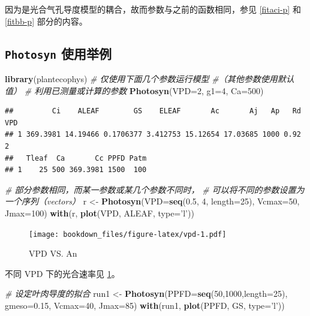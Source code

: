 \documentclass[]{krantz}
\makeatletter
\newenvironment{Shaded}{\begin{snugshade}}{\end{snugshade}}
\newcommand{\KeywordTok}[1]{\textcolor[rgb]{0.13,0.29,0.53}{\textbf{#1}}}
\newcommand{\DataTypeTok}[1]{\textcolor[rgb]{0.13,0.29,0.53}{#1}}
\newcommand{\DecValTok}[1]{\textcolor[rgb]{0.00,0.00,0.81}{#1}}
\newcommand{\FloatTok}[1]{\textcolor[rgb]{0.00,0.00,0.81}{#1}}
\newcommand{\StringTok}[1]{\textcolor[rgb]{0.31,0.60,0.02}{#1}}
\newcommand{\CommentTok}[1]{\textcolor[rgb]{0.56,0.35,0.01}{\textit{#1}}}
\newcommand{\NormalTok}[1]{#1}
\newenvironment{kframe}{%
\medskip{}
\setlength{\fboxsep}{.8em}
 \def\at@end@of@kframe{}%
 \ifinner\ifhmode%
  \def\at@end@of@kframe{\end{minipage}}%
  \begin{minipage}{\columnwidth}%
 \fi\fi%
 \def\FrameCommand##1{\hskip\@totalleftmargin \hskip-\fboxsep
 \colorbox{shadecolor}{##1}\hskip-\fboxsep
     \hskip-\linewidth \hskip-\@totalleftmargin \hskip\columnwidth}%
 \MakeFramed {\advance\hsize-\width
   \@totalleftmargin\z@ \linewidth\hsize
   \@setminipage}}%
 {\par\unskip\endMakeFramed%
 \at@end@of@kframe}
\renewenvironment{Shaded}{\begin{kframe}}{\end{kframe}}
\theoremstyle{definition}
\theoremstyle{definition}
\theoremstyle{definition}
\theoremstyle{remark}
\makeatother
\begin{document}
因为是光合气孔导度模型的耦合，故而参数与之前的函数相同，参见
\ref{fitaci-p} 和 \ref{fitbb-p} 部分的内容。

\subsection{\texorpdfstring{\texttt{Photosyn}
使用举例}{Photosyn 使用举例}}\label{photosyn-}

\begin{Shaded}
\begin{Highlighting}[]
\KeywordTok{library}\NormalTok{(plantecophys)}
\CommentTok{# 仅使用下面几个参数运行模型}
\CommentTok{#（其他参数使用默认值）}
\CommentTok{# 利用已测量或计算的参数}
\KeywordTok{Photosyn}\NormalTok{(}\DataTypeTok{VPD=}\DecValTok{2}\NormalTok{, }\DataTypeTok{g1=}\DecValTok{4}\NormalTok{, }\DataTypeTok{Ca=}\DecValTok{500}\NormalTok{)}
\end{Highlighting}
\end{Shaded}

\begin{verbatim}
##         Ci    ALEAF        GS    ELEAF       Ac       Aj   Ap   Rd VPD
## 1 369.3981 14.19466 0.1706377 3.412753 15.12654 17.03685 1000 0.92   2
##   Tleaf  Ca       Cc PPFD Patm
## 1    25 500 369.3981 1500  100
\end{verbatim}

\begin{Shaded}
\begin{Highlighting}[]
\CommentTok{# 部分参数相同，而某一参数或某几个参数不同时，}
\CommentTok{# 可以将不同的参数设置为一个序列（vectors）}
\NormalTok{r <-}\StringTok{ }\KeywordTok{Photosyn}\NormalTok{(}\DataTypeTok{VPD=}\KeywordTok{seq}\NormalTok{(}\FloatTok{0.5}\NormalTok{, }\DecValTok{4}\NormalTok{, }\DataTypeTok{length=}\DecValTok{25}\NormalTok{), }
              \DataTypeTok{Vcmax=}\DecValTok{50}\NormalTok{, }\DataTypeTok{Jmax=}\DecValTok{100}\NormalTok{)}
\KeywordTok{with}\NormalTok{(r, }\KeywordTok{plot}\NormalTok{(VPD, ALEAF, }\DataTypeTok{type=}\StringTok{'l'}\NormalTok{))}
\end{Highlighting}
\end{Shaded}

\begin{figure}
\centering
\texttt{[image: bookdown\_files/figure-latex/vpd-1.pdf]}
\caption{\label{fig:vpd}VPD VS. An}
\end{figure}

不同 VPD 下的光合速率见 \ref{fig:vpd}。

\begin{Shaded}
\begin{Highlighting}[]
\CommentTok{# 设定叶肉导度的拟合}
\NormalTok{run1 <-}\StringTok{ }\KeywordTok{Photosyn}\NormalTok{(}\DataTypeTok{PPFD=}\KeywordTok{seq}\NormalTok{(}\DecValTok{50}\NormalTok{,}\DecValTok{1000}\NormalTok{,}\DataTypeTok{length=}\DecValTok{25}\NormalTok{), }
                 \DataTypeTok{gmeso=}\FloatTok{0.15}\NormalTok{, }\DataTypeTok{Vcmax=}\DecValTok{40}\NormalTok{, }\DataTypeTok{Jmax=}\DecValTok{85}\NormalTok{)}
\KeywordTok{with}\NormalTok{(run1, }\KeywordTok{plot}\NormalTok{(PPFD, GS, }\DataTypeTok{type=}\StringTok{'l'}\NormalTok{))}
\end{Highlighting}
\end{Shaded}
\end{document}
